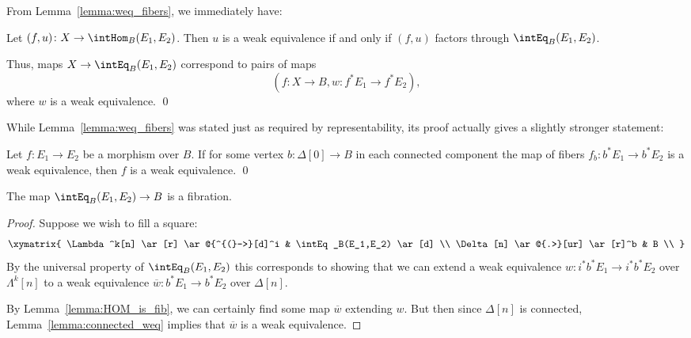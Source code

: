 From Lemma~\ref{lemma:weq_fibers}, we immediately have:

\begin{corollary}\label{cor:weqs_representable}
 Let $(f, u) \colon X \to \intHom_B (E_1, E_2)$.  Then $u$ is a weak equivalence if and only if $(f, u)$ factors through $\intEq_B (E_1, E_2)$.

 Thus, maps $X \to \intEq_B(E_1,E_2)$ correspond to pairs of maps
 \[(f \colon X \to B, w \colon f^*E_1 \to f^* E_2),\]
 where $w$ is a weak equivalence. \qed
\end{corollary}

While Lemma~\ref{lemma:weq_fibers} was stated just as required by representability, its proof actually gives a slightly stronger statement:

\begin{lemma} \label{lemma:connected_weq}  %
 Let $f \colon E_1 \to E_2$ be a morphism over $B$.  If for some vertex $b \colon \Delta [0] \to B$ in each connected component the map of fibers $f_b \colon b^*E_1 \to b^* E_2$ is a weak equivalence, then $f$ is a weak equivalence. \qed
\end{lemma}

\begin{corollary} \label{cor:eq_is_fib}
 The map $\intEq_B(E_1,E_2) \to B$ is a fibration.
\end{corollary}

\begin{proof}
 Suppose we wish to fill a square:
 \[\xymatrix{ \Lambda^k[n] \ar[r] \ar@{^{(}->}[d]^i & \intEq_B(E_1,E_2) \ar[d] \\ %
  \Delta[n] \ar@{.>}[ur] \ar[r]^b & B \\
 }\]
 By the universal property of $\intEq_B(E_1,E_2)$ this corresponds to showing that we can extend a weak equivalence $w \colon i^*b^*E_1 \to i^*b^*E_2$ over $\Lambda^k[n]$ to a weak equivalence $\overline{w} \colon b^*E_1 \to b^*E_2$ over $\Delta[n]$.

 By Lemma~\ref{lemma:HOM_is_fib}, we can certainly find some map $\overline{w}$ extending $w$.  But then since $\Delta[n]$ is connected, Lemma~\ref{lemma:connected_weq} implies that $\overline{w}$ is a weak equivalence.
\end{proof}

